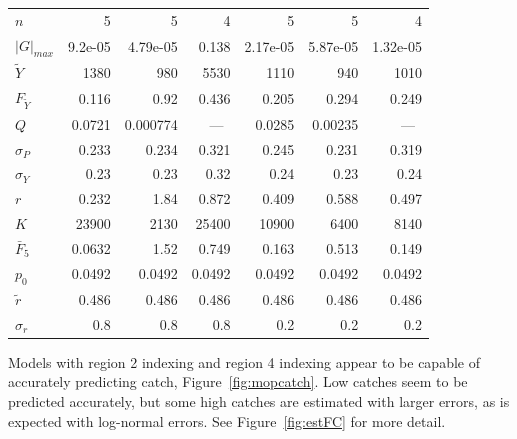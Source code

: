 \documentclass[12pt,letterpaper]{article}
\newcommand\MSY{\widetilde{Y}}
\newcommand\Fmsy{F_{\MSY}}
\begin{document}
\begin{table}
{\begin{center}
\begin{tabular}{|l|rrr|rrr|}
$n$ & 5 & 5 & 4 & 5 & 5 & 4\\
$|G|_{max}$ & 9.2e-05 & 4.79e-05 & 0.138 & 2.17e-05 & 5.87e-05 & 1.32e-05\\
\hline
$\MSY$ & 1380 & 980 & 5530 & 1110 & 940 & 1010\\
$\Fmsy$ & 0.116 & 0.92 & 0.436 & 0.205 & 0.294 & 0.249\\
$Q$ & 0.0721 & 0.000774 & ~---~ & 0.0285 & 0.00235 & ~---~\\
$\sigma_P$ & 0.233 & 0.234 & 0.321 & 0.245 & 0.231 & 0.319\\
$\sigma_Y$ & 0.23 & 0.23 & 0.32 & 0.24 & 0.23 & 0.24\\
\hline
$r$ & 0.232 & 1.84 & 0.872 & 0.409 & 0.588 & 0.497\\
$K$ & 23900 & 2130 & 25400 & 10900 & 6400 & 8140\\
$\bar{F}_5$ & 0.0632 & 1.52 & 0.749 & 0.163 & 0.513 & 0.149\\
\hline
$p_0$ & 0.0492 & 0.0492 & 0.0492 & 0.0492 & 0.0492 & 0.0492\\
$\tilde{r}$ & 0.486 & 0.486 & 0.486 & 0.486 & 0.486 & 0.486\\
$\sigma_r$ & 0.8 & 0.8 & 0.8 & 0.2 & 0.2 & 0.2\\
\hline
\end{tabular}
\end{center}
}
\end{table}


Models with region 2 indexing and region 4 indexing appear to be
capable of accurately predicting catch,
Figure~\ref{fig:mopcatch}. Low catches seem to be predicted
accurately, but some high catches are estimated with larger errors, as is
expected with log-normal errors. 
See Figure~\ref{fig:estFC} for more detail.
\end{document}
